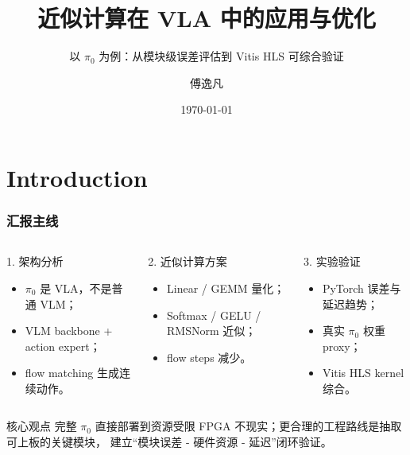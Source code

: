 \documentclass[10pt, aspectratio=169]{beamer}
\title{近似计算在 VLA 中的应用与优化}
\subtitle{以 \texorpdfstring{$\pi_0$}{pi0} 为例：从模块级误差评估到 Vitis HLS 可综合验证}
\date{\today}
\author{傅逸凡}
\institute{电气工程学院, 西南交通大学}
\newcommand{\piZero}{\texorpdfstring{$\pi_0$}{pi0}\xspace}
\begin{document}
\maketitle

\section{Introduction}

\begin{frame}
  \frametitle{汇报主线}
  \small
  \begin{columns}[T,onlytextwidth]
    \begin{block}{1. 架构分析}
      \begin{itemize}
        \item \piZero 是 VLA，不是普通 VLM；
        \item VLM backbone + action expert；
        \item flow matching 生成连续动作。
      \end{itemize}
    \end{block}

    \begin{block}{2. 近似计算方案}
      \begin{itemize}
        \item Linear / GEMM 量化；
        \item Softmax / GELU / RMSNorm 近似；
        \item flow steps 减少。
      \end{itemize}
    \end{block}

    \begin{alertblock}{3. 实验验证}
      \begin{itemize}
        \item PyTorch 误差与延迟趋势；
        \item 真实 \piZero 权重 proxy；
        \item Vitis HLS kernel 综合。
      \end{itemize}
    \end{alertblock}
  \end{columns}

  \vspace{5pt}
  \begin{exampleblock}{核心观点}
    完整 \piZero 直接部署到资源受限 FPGA 不现实；更合理的工程路线是抽取可上板的关键模块，
    建立“模块误差 - 硬件资源 - 延迟”闭环验证。
  \end{exampleblock}
\end{frame}
\end{document}
